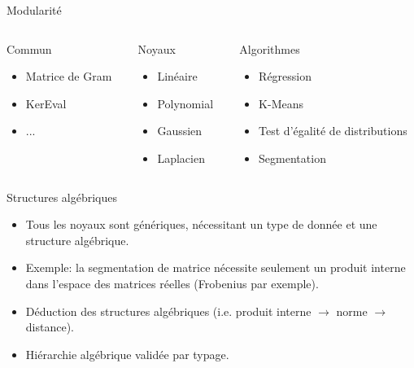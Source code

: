 \documentclass{beamer}
\begin{document}
\begin{frame}{Modularité}
	\begin{columns}
		\begin{column}{0.3\textwidth}
			\begin{block}{Commun}
				\begin{itemize}
					\item Matrice de Gram
					\item KerEval
					\item ...
				\end{itemize}
			\end{block}
		\end{column}
		\begin{column}{0.3\textwidth}
			\begin{block}{Noyaux}
				\begin{itemize}
					\item Linéaire
					\item Polynomial
					\item Gaussien
					\item Laplacien
				\end{itemize}
			\end{block}
		\end{column}
		\begin{column}{0.3\textwidth}
			\begin{block}{Algorithmes}
				\begin{itemize}
					\item Régression
					\item K-Means
					\item Test d'égalité de distributions
					\item Segmentation
				\end{itemize}
			\end{block}
		\end{column}
	\end{columns}
\end{frame}

\begin{frame}{Structures algébriques}
	\begin{itemize}
		\item Tous les noyaux sont génériques, nécessitant un type de donnée et une structure algébrique.
		\item Exemple: la segmentation de matrice nécessite seulement un produit interne dans l'espace des matrices réelles (Frobenius par exemple).
		\item Déduction des structures algébriques (i.e. produit interne $\rightarrow$ norme $\rightarrow$ distance).
		\item Hiérarchie algébrique validée par typage.
	\end{itemize}
\end{frame}
\end{document}
